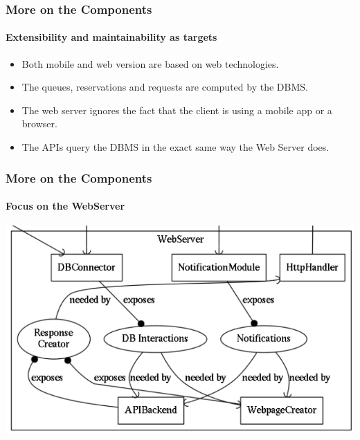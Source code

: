 \documentclass[10pt,xcolor={usenames,dvipsnames}]{beamer}
\begin{document}
\begin{frame}
	\frametitle{More on the Components}
	\framesubtitle{Extensibility and maintainability as targets}
	\begin{itemize}
		\item Both mobile and web version are based on web technologies.
		\item The queues, reservations and requests are computed by the DBMS.
		\item The web server ignores the fact that the client is using a mobile app or a browser.
		\item The APIs query the DBMS in the exact same way the Web Server does.
	\end{itemize}
\end{frame}
\begin{frame}
	\frametitle{More on the Components}
	\framesubtitle{Focus on the WebServer}
	\begin{center}
		\includegraphics[width=\textwidth,height=\textheight,keepaspectratio]{dot/Webserver}
	\end{center}

\end{frame}
\end{document}
